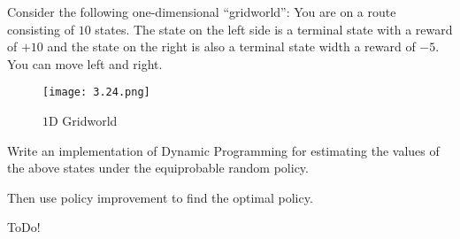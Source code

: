 
\begin{exercise}

Consider the following one-dimensional \enquote{gridworld}:
You are on a route consisting of $10$ states.
The state on the left side is a terminal state with a reward of $+10$ and the state on the right is also a terminal state width a reward of $-5$.
You can move left and right.

\begin{figure}[H]
    \centering
    \texttt{[image: 3.24.png]}
    \caption{$1$D Gridworld}
    \label{fig:3.24}
\end{figure}

Write an implementation of Dynamic Programming for estimating the values of the above states under the equiprobable random policy.

Then use policy improvement to find the optimal policy.

\end{exercise}


\begin{solution}

ToDo!

\end{solution}

